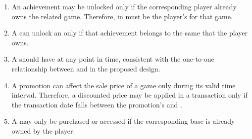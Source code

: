 \begin{enumerate}
    \item An achievement may be unlocked only if the corresponding player already owns the related game. Therefore,  in  must be  the player's  for that game.

    \item A  can unlock an  only if that achievement belongs to the same  that the player owns.

    \item A  should have  at any point in time, consistent with the one-to-one relationship between  and  in the proposed design.

    \item A promotion can affect the sale price of a game only during its valid time interval. Therefore, a discounted price may be applied in a transaction only if the transaction date falls between the promotion's  and .

    \item A  may only be purchased or accessed if the corresponding base  is already owned by the player.
\end{enumerate}